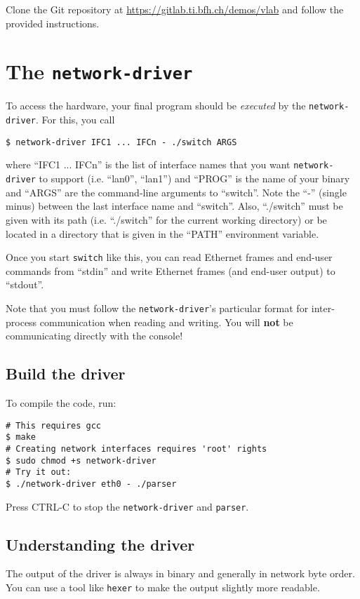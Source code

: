 \documentclass{article}
\begin{document}
Clone the Git repository at
\url{https://gitlab.ti.bfh.ch/demos/vlab} and follow the provided
instructions.

\section{The {\tt network-driver}}

To access the hardware, your final program should be {\em executed}
by the {\tt network-driver}.  For this, you call
\begin{verbatim}
$ network-driver IFC1 ... IFCn - ./switch ARGS
\end{verbatim}
where ``IFC1 ... IFCn'' is the list of interface names that you want
{\tt network-driver} to support (i.e. ``lan0'', ``lan1'') and ``PROG''
is the name of your binary and ``ARGS'' are the command-line arguments
to ``switch''.  Note the ``-'' (single minus) between the last
interface name and ``switch''.  Also, ``./switch'' must be given with
its path (i.e. ``./switch'' for the current working directory) or be
located in a directory that is given in the ``PATH'' environment
variable.

Once you start {\tt switch} like this, you can read Ethernet frames
and end-user commands from ``stdin'' and write Ethernet
frames (and end-user output) to ``stdout''.

Note that you must follow the {\tt network-driver}'s particular
format for inter-process communication when reading and writing.
You will {\bf not} be communicating directly with the console!


\subsection{Build the driver}

To compile the code, run:
\begin{verbatim}
# This requires gcc
$ make
# Creating network interfaces requires 'root' rights
$ sudo chmod +s network-driver
# Try it out:
$ ./network-driver eth0 - ./parser
\end{verbatim}
Press CTRL-C to stop the {\tt network-driver} and {\tt parser}.


\subsection{Understanding the driver}

The output of the driver is always in binary and generally in network
byte order.  You can use a tool like {\tt hexer} to make the output
slightly more readable.
\end{document}
